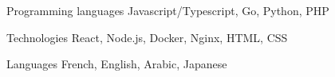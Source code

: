 

\begin{cvskills}

  \cvskill
    {Programming languages} %
    {Javascript/Typescript, Go, Python, PHP} %

  \cvskill
    {Technologies} %
    {React, Node.js, Docker, Nginx, HTML, CSS}  %

  \cvskill
    {Languages} %
    {French, English, Arabic, Japanese} %

\end{cvskills}
